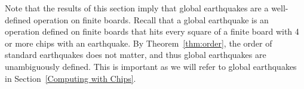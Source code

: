 \documentclass[runningheads,a4paper]{llncs}
\begin{document}
Note that the results of this section imply that global earthquakes are a well-defined operation on finite boards. Recall that a global earthquake is an operation defined on finite boards that hits every square of a finite board with 4 or more chips with an earthquake. By Theorem~\ref{thm:order}, the order of standard earthquakes does not matter, and thus global earthquakes are unambiguously defined. This is important as we will refer to global earthquakes in Section~\ref{Computing with Chips}.
%
%
%
%
%
%
\end{document}
